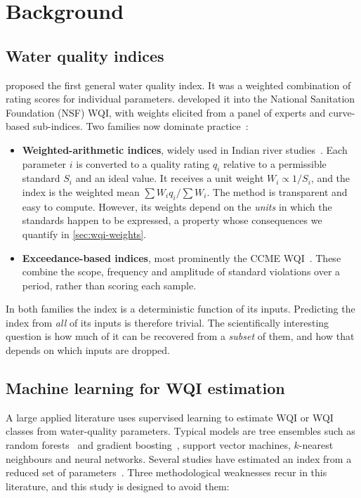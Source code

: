 \section{Background}
\label{sec:background}

\subsection{Water quality indices}

\citet{horton1965} proposed the first general water quality index. It was a weighted combination of rating scores for individual parameters. \citet{brown1970} developed it into the National Sanitation Foundation (NSF) WQI, with weights elicited from a panel of experts and curve-based sub-indices. Two families now dominate practice~\citep{uddin2021}:

\begin{itemize}
  \item \textbf{Weighted-arithmetic indices}, widely used in Indian river studies~\citep{tyagi2013}. Each parameter $i$ is converted to a quality rating $q_i$ relative to a permissible standard $S_i$ and an ideal value. It receives a unit weight $W_i \propto 1/S_i$, and the index is the weighted mean $\sum W_i q_i / \sum W_i$. The method is transparent and easy to compute. However, its weights depend on the \emph{units} in which the standards happen to be expressed, a property whose consequences we quantify in \cref{sec:wqi-weights}.
  \item \textbf{Exceedance-based indices}, most prominently the CCME WQI~\citep{ccme2001}. These combine the scope, frequency and amplitude of standard violations over a period, rather than scoring each sample.
\end{itemize}

In both families the index is a deterministic function of its inputs. Predicting the index from \emph{all} of its inputs is therefore trivial. The scientifically interesting question is how much of it can be recovered from a \emph{subset} of them, and how that depends on which inputs are dropped.

\subsection{Machine learning for WQI estimation}

A large applied literature uses supervised learning to estimate WQI or WQI classes from water-quality parameters. Typical models are tree ensembles such as random forests~\citep{breiman2001} and gradient boosting~\citep{chen2016}, support vector machines, $k$-nearest neighbours and neural networks. Several studies have estimated an index from a reduced set of parameters~\citep[e.g.][]{ahmed2019}. Three methodological weaknesses recur in this literature, and this study is designed to avoid them:

